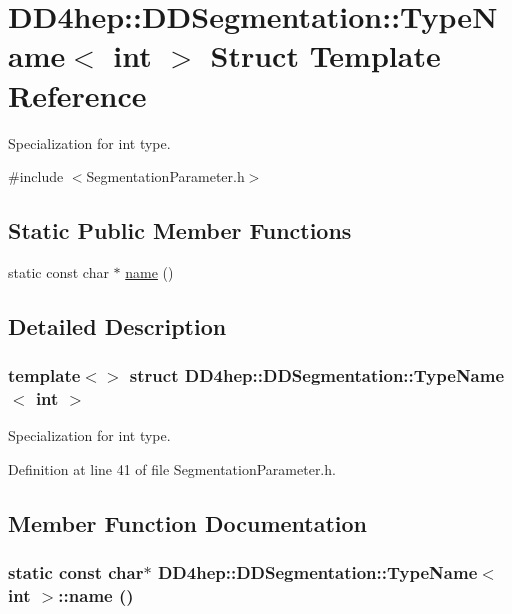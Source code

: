 \hypertarget{struct_d_d4hep_1_1_d_d_segmentation_1_1_type_name_3_01int_01_4}{
\section{DD4hep::DDSegmentation::TypeName$<$ int $>$ Struct Template Reference}
\label{struct_d_d4hep_1_1_d_d_segmentation_1_1_type_name_3_01int_01_4}
}


Specialization for int type.  


{\ttfamily \#include $<$SegmentationParameter.h$>$}\subsection*{Static Public Member Functions}
\begin{DoxyCompactItemize}
\item 
static const char $\ast$ \hyperlink{struct_d_d4hep_1_1_d_d_segmentation_1_1_type_name_3_01int_01_4_a723ff39181d093b9b3e07c7dbb726450}{name} ()
\end{DoxyCompactItemize}


\subsection{Detailed Description}
\subsubsection*{template$<$$>$ struct DD4hep::DDSegmentation::TypeName$<$ int $>$}

Specialization for int type. 

Definition at line 41 of file SegmentationParameter.h.

\subsection{Member Function Documentation}
\hypertarget{struct_d_d4hep_1_1_d_d_segmentation_1_1_type_name_3_01int_01_4_a723ff39181d093b9b3e07c7dbb726450}{
\subsubsection[{name}]{\setlength{\rightskip}{0pt plus 5cm}static const char$\ast$ {\bf DD4hep::DDSegmentation::TypeName}$<$ int $>$::name ()}}
\label{struct_d_d4hep_1_1_d_d_segmentation_1_1_type_name_3_01int_01_4_a723ff39181d093b9b3e07c7dbb726450}


